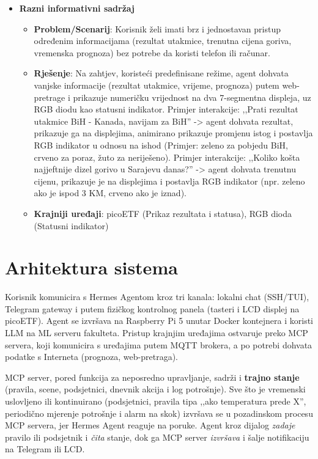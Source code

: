 \documentclass[11pt,a4paper]{article}
\begin{document}
\begin{itemize}[nosep]
      \item \textbf{Razni informativni sadržaj}
            \begin{itemize}
                  \item \textbf{Problem/Scenarij}: Korisnik želi imati brz i jednostavan pristup određenim informacijama (rezultat utakmice, trenutna cijena goriva, vremenska prognoza) bez potrebe da koristi telefon ili računar.
                  \item \textbf{Rješenje}:  Na zahtjev, koristeći predefinisane režime, agent dohvata vanjske informacije (rezultat utakmice, vrijeme, prognoza) putem web-pretrage i prikazuje numeričku vrijednost na dva 7-segmentna displeja, uz RGB diodu kao statusni indikator.
                        Primjer interakcije: ,,Prati rezultat utakmice BiH - Kanada, navijam za BiH'' -> agent dohvata rezultat, prikazuje ga na displejima, animirano prikazuje promjenu istog i postavlja RGB indikator u odnosu na ishod (Primjer: zeleno za pobjedu BiH, crveno za poraz, žuto za neriješeno).
                        Primjer interakcije: ,,Koliko košta najjeftnije dizel gorivo u Sarajevu danas?'' -> agent dohvata trenutnu cijenu, prikazuje je na displejima i postavlja RGB indikator (npr. zeleno ako je ispod 3 KM, crveno ako je iznad).
                  \item \textbf{Krajniji uređaji}: picoETF (Prikaz rezultata i statusa), RGB dioda (Statusni indikator)
            \end{itemize}

\end{itemize}

\section{Arhitektura sistema}

Korisnik komunicira s Hermes Agentom kroz tri kanala: lokalni chat (SSH/TUI), Telegram
gateway i putem fizičkog kontrolnog panela (tasteri i LCD displej na picoETF).
Agent se izvršava na Raspberry Pi 5 unutar Docker kontejnera i koristi LLM na ML serveru fakulteta.
Pristup krajnjim uređajima ostvaruje preko MCP servera, koji komunicira s uređajima putem MQTT brokera, a
po potrebi dohvata podatke s Interneta (prognoza, web-pretraga).

MCP server, pored funkcija za neposredno upravljanje, sadrži i \textbf{trajno stanje}
(pravila, scene, podsjetnici, dnevnik akcija i log potrošnje). Sve što je vremenski
uslovljeno ili kontinuirano (podsjetnici, pravila tipa ,,ako temperatura prede X'',
periodično mjerenje potrošnje i alarm na skok) izvršava se u pozadinskom procesu MCP
servera, jer Hermes Agent reaguje na poruke. Agent kroz dijalog
\emph{zadaje} pravilo ili podsjetnik i \emph{čita} stanje, dok ga MCP server
\emph{izvršava} i šalje notifikaciju na Telegram ili LCD.
\end{document}

